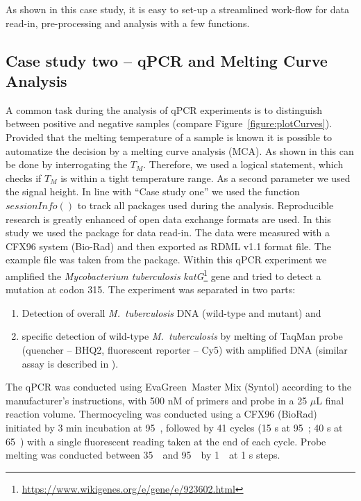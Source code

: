 As shown in this case study, it is easy to set-up a streamlined work-flow for data 
read-in, pre-processing and analysis with a few functions.

\subsection{Case study two -- qPCR and Melting Curve Analysis}

A common task during the analysis of qPCR experiments is to distinguish between 
positive and negative samples (compare Figure~\ref{figure:plotCurves}). Provided 
that the melting temperature of a sample is known it is possible to automatize 
the decision by a melting curve analysis (MCA). As shown in 
\citet{roediger_RJ_2013} this can be done by interrogating the $T_{M}$. 
Therefore, we used a logical statement, which checks if $T_{M}$ is within a 
tight temperature range. As a second parameter we used the signal height. In 
line with ``Case study one'' we used the function $sessionInfo()$ to track all 
packages used during the analysis. Reproducible research is greatly enhanced of 
open data exchange formats are used. In this study we used the  
package for data read-in. The data were measured with a CFX96 system (Bio-Rad) 
and then exported as RDML v1.1 format file. The example file 
 was taken from the  package. Within 
this qPCR experiment we amplified the \textit{Mycobacterium tuberculosis} 
\textit{katG}\footnote{\url{https://www.wikigenes.org/e/gene/e/923602.html}} 
gene and tried to detect a mutation at codon 315. The experiment was separated 
in two parts: 
\begin{enumerate}
 \item Detection of overall \textit{M.~tuberculosis} DNA (wild-type 
and mutant) and
 \item specific detection of wild-type \textit{M.~tuberculosis} by melting of 
TaqMan probe (quencher -- BHQ2, fluorescent reporter -- Cy5) with amplified DNA 
(similar assay is described in \citet{luo_multiplex_2011}).
\end{enumerate}

The qPCR was conducted using EvaGreen\circledR~Master Mix (Syntol) according to 
the manufacturer's instructions, with 500 nM of primers and probe in a 25 $\mu$L 
final reaction volume. Thermocycling was conducted using a CFX96 (BioRad) 
initiated by 3 min incubation at 95~\textcelsius, followed by 41 cycles (15 s at 
95~\textcelsius; 40 s at 65~\textcelsius) with a single fluorescent reading 
taken at the end of each cycle. Probe melting was conducted between 
35~\textcelsius~and 95~\textcelsius~by 1~\textcelsius~at 1 s steps.

